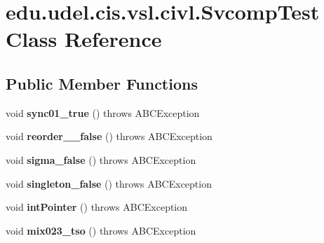 \hypertarget{classedu_1_1udel_1_1cis_1_1vsl_1_1civl_1_1SvcompTest}{}\section{edu.\+udel.\+cis.\+vsl.\+civl.\+Svcomp\+Test Class Reference}
\label{classedu_1_1udel_1_1cis_1_1vsl_1_1civl_1_1SvcompTest}
\subsection*{Public Member Functions}
\begin{DoxyCompactItemize}
\item 
\hypertarget{classedu_1_1udel_1_1cis_1_1vsl_1_1civl_1_1SvcompTest_aaf90304dd959d0530a0e45241ed33c70}{}void {\bfseries sync01\+\_\+true} ()  throws A\+B\+C\+Exception \label{classedu_1_1udel_1_1cis_1_1vsl_1_1civl_1_1SvcompTest_aaf90304dd959d0530a0e45241ed33c70}

\item 
\hypertarget{classedu_1_1udel_1_1cis_1_1vsl_1_1civl_1_1SvcompTest_a35abe65b9e524af5c633c081194b10d0}{}void {\bfseries reorder\+\_\+\_\+false} ()  throws A\+B\+C\+Exception \label{classedu_1_1udel_1_1cis_1_1vsl_1_1civl_1_1SvcompTest_a35abe65b9e524af5c633c081194b10d0}

\item 
\hypertarget{classedu_1_1udel_1_1cis_1_1vsl_1_1civl_1_1SvcompTest_ad5dadf4b41e630a0404b5123c06672b5}{}void {\bfseries sigma\+\_\+false} ()  throws A\+B\+C\+Exception \label{classedu_1_1udel_1_1cis_1_1vsl_1_1civl_1_1SvcompTest_ad5dadf4b41e630a0404b5123c06672b5}

\item 
\hypertarget{classedu_1_1udel_1_1cis_1_1vsl_1_1civl_1_1SvcompTest_a1afed6b1f3285a7a72a545ddba03edb7}{}void {\bfseries singleton\+\_\+false} ()  throws A\+B\+C\+Exception \label{classedu_1_1udel_1_1cis_1_1vsl_1_1civl_1_1SvcompTest_a1afed6b1f3285a7a72a545ddba03edb7}

\item 
\hypertarget{classedu_1_1udel_1_1cis_1_1vsl_1_1civl_1_1SvcompTest_adc75ec535640bd669976a2d8345772e3}{}void {\bfseries int\+Pointer} ()  throws A\+B\+C\+Exception \label{classedu_1_1udel_1_1cis_1_1vsl_1_1civl_1_1SvcompTest_adc75ec535640bd669976a2d8345772e3}

\item 
\hypertarget{classedu_1_1udel_1_1cis_1_1vsl_1_1civl_1_1SvcompTest_a4bedaca5d32a05fee72f9219a48a66fd}{}void {\bfseries mix023\+\_\+tso} ()  throws A\+B\+C\+Exception \label{classedu_1_1udel_1_1cis_1_1vsl_1_1civl_1_1SvcompTest_a4bedaca5d32a05fee72f9219a48a66fd}


\end{DoxyCompactItemize}

